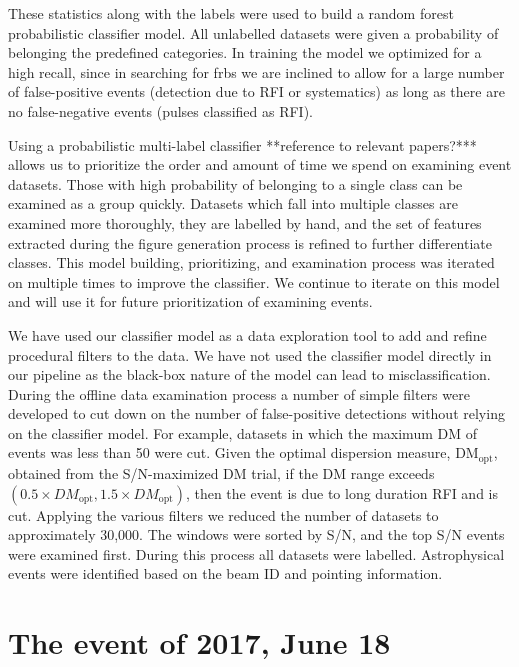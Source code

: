 \documentclass[a4paper,fleqn,usenatbib]{mnras}
\begin{document}
These statistics along with the labels were used to build a random forest
probabilistic classifier model. All unlabelled datasets were given a probability
of belonging the predefined categories. In training the model we optimized for a
high recall, since in searching for \glspl{frb} we are inclined to allow for a
large number of false-positive events (detection due to RFI or systematics) as
long as there are no false-negative events (pulses classified as RFI).

Using a probabilistic multi-label classifier **reference to relevant papers?***
allows us to prioritize the order and amount of time we spend on examining event
datasets. Those with high probability of belonging to a single class can be
examined as a group quickly.  Datasets which fall into multiple classes are
examined more thoroughly, they are labelled by hand, and the set of features
extracted during the figure generation process is refined to further
differentiate classes. This model building, prioritizing, and examination
process was iterated on multiple times to improve the classifier. We continue to
iterate on this model and will use it for future prioritization of examining
events.

We have used our classifier model as a data exploration tool to add and refine
procedural filters to the data. We have not used the classifier model directly
in our pipeline as the black-box nature of the model can lead to
misclassification.  During the offline data examination process a number of
simple filters were developed to cut down on the number of false-positive
detections without relying on the classifier model. For example, datasets in
which the maximum DM of events was less than 50 were cut.  Given the optimal
dispersion measure, DM$_{\textrm{opt}}$, obtained from the S/N-maximized DM
trial,  if the DM range exceeds $(0.5 \times DM_{\textrm{opt}}, 1.5 \times
DM_{\textrm{opt}})$, then the event is due to long duration RFI and is cut.
Applying the various filters we reduced the number of datasets to approximately
30,000. The windows were sorted by S/N, and the top S/N events were examined
first.  During this process all datasets were labelled.  Astrophysical events
were identified based on the beam ID and pointing information.


\section{The event of 2017, June 18}
\label{sec:18062017}
\end{document}
